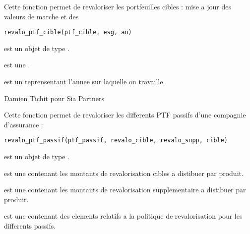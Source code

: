 \documentclass[a4paper]{book}
\begin{document}
%
\begin{Description}\relax
Cette fonction permet de revaloriser les portfeuilles cibles : mise a jour des valeurs de marche et des
\end{Description}
%
\begin{Usage}
\begin{verbatim}
revalo_ptf_cible(ptf_cible, esg, an)
\end{verbatim}
\end{Usage}
%
\begin{Arguments}
\begin{ldescription}
\item[\code{ptf\_cible}] est un objet de type .

\item[\code{esg}] est une .

\item[\code{an}] est un  reprensentant l'annee sur laquelle on travaille.
\end{ldescription}
\end{Arguments}
%
\begin{Author}\relax
Damien Tichit pour Sia Partners
\end{Author}
%
\begin{Description}\relax
Cette fonction permet de revaloriser les differents PTF passifs d'une compagnie d'assurance :
\end{Description}
%
\begin{Usage}
\begin{verbatim}
revalo_ptf_passif(ptf_passif, revalo_cible, revalo_supp, cible)
\end{verbatim}
\end{Usage}
%
\begin{Arguments}
\begin{ldescription}
\item[\code{ptf\_passif}] est un objet de type .

\item[\code{revalo\_cible}] est une  contenant les montants de revalorisation cibles a distibuer par produit.

\item[\code{revalo\_supp}] est une  contenant les montants de revalorisation supplementaire a distibuer par produit.

\item[\code{cible}] est une  contenant des elements relatifs a la politique de revalorisation pour les differents passifs.
\end{ldescription}
\end{Arguments}
\end{document}
